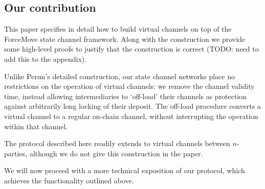 \subsection{Our contribution}

This paper specifies in detail how to build virtual channels on top of the ForceMove state channel framework.
Along with the construction we provide some high-level proofs to justify that the construction is correct (TODO: need to add this to the appendix).

Unlike Perun's detailed construction, our state channel networks place no restrictions on the operation of virtual channels:
we remove the channel validity time, instead allowing intermediaries to `off-load' their channels as protection against arbitrarily long locking of their deposit.
The off-load procedure converts a virtual channel to a regular on-chain channel, without interrupting the operation within that channel.

The protocol described here readily extends to virtual channels between $n$-parties, although we do not give this construction in the paper.

We will now proceed with a more technical exposition of our protocol, which achieves the functionality outlined above.

